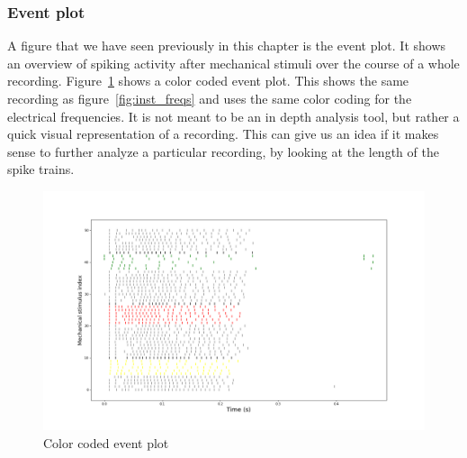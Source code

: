 \subsubsection{Event plot}
A figure that we have seen previously in this chapter is the event plot. It shows an overview of spiking activity after mechanical stimuli over the course of a whole recording. Figure~\ref{fig:event_color} shows a color coded event plot. This shows the same recording as figure~\ref{fig:inst_freqs} and uses the same color coding for the electrical frequencies. It is not meant to be an in depth analysis tool, but rather a quick visual representation of a recording. This can give us an idea if it makes sense to further analyze a particular recording, by looking at the length of the spike trains.

\begin{figure}
	\includegraphics[width = \textwidth]{src/pic/11_12_13U1bevent_color}
	\caption{Color coded event plot}
	\label{fig:event_color}
\end{figure}







\cleardoublepage
